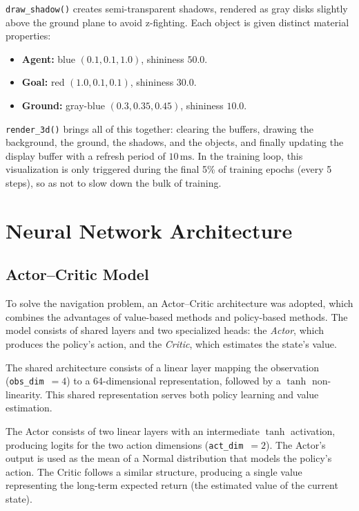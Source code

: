 \documentclass[11pt]{article}
\begin{document}
\texttt{draw\_shadow()} creates semi-transparent shadows, rendered as gray disks slightly above the
ground plane to avoid z-fighting. Each object is given distinct material properties:
\begin{itemize}
  \item \textbf{Agent:} blue $(0.1, 0.1, 1.0)$, shininess $50.0$.
  \item \textbf{Goal:} red $(1.0, 0.1, 0.1)$, shininess $30.0$.
  \item \textbf{Ground:} gray-blue $(0.3, 0.35, 0.45)$, shininess $10.0$.
\end{itemize}

\texttt{render\_3d()} brings all of this together: clearing the buffers, drawing the background, the
ground, the shadows, and the objects, and finally updating the display buffer with a refresh period of
$10\,\text{ms}$. In the training loop, this visualization is only triggered during the final 5\% of
training epochs (every 5 steps), so as not to slow down the bulk of training.

\section{Neural Network Architecture}

\subsection{Actor--Critic Model}

To solve the navigation problem, an Actor--Critic architecture was adopted, which combines the
advantages of value-based methods and policy-based methods. The model consists of shared layers and two
specialized heads: the \emph{Actor}, which produces the policy's action, and the \emph{Critic}, which
estimates the state's value.

The shared architecture consists of a linear layer mapping the observation (\texttt{obs\_dim}~$=4$) to a
64-dimensional representation, followed by a $\tanh$ non-linearity. This shared representation serves
both policy learning and value estimation.

The Actor consists of two linear layers with an intermediate $\tanh$ activation, producing logits for
the two action dimensions (\texttt{act\_dim}~$=2$). The Actor's output is used as the mean of a Normal
distribution that models the policy's action. The Critic follows a similar structure, producing a single
value representing the long-term expected return (the estimated value of the current state).
\end{document}
